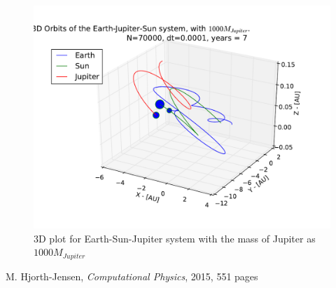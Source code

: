 \documentclass{article}
\begin{document}
\begin{figure}[!h]
\centering
\includegraphics[width=\linewidth]{Plots/Earth_Sun_Jupiter_1000MJ_3D.pdf}
\caption{3D plot for Earth-Sun-Jupiter system with the mass of Jupiter as $1000M_{Jupiter}$}
\label{fig:Appendix_1000MJ}
\end{figure}

\FloatBarrier
\begin{thebibliography}{1}
     M. Hjorth-Jensen, \emph{Computational Physics}, 2015, 551 pages
\end{thebibliography}
\end{document}
